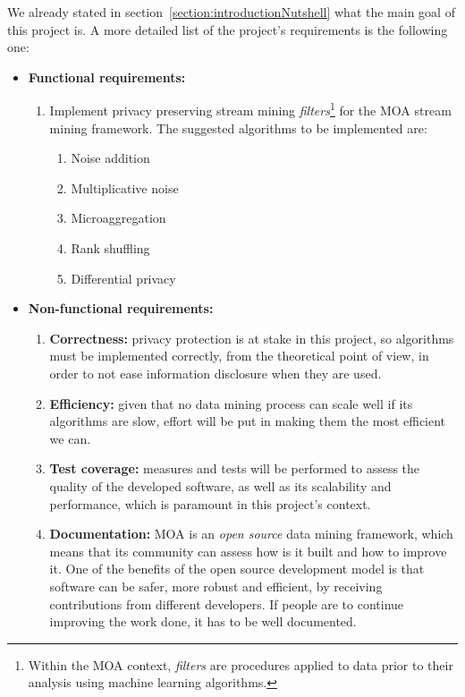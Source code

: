 We already stated in section~\ref{section:introductionNutshell} what the main goal of this project is. A more detailed list of the project's requirements is the following one:

\begin{itemize}
	\item \textbf{Functional requirements:} 
	\begin{enumerate}
		\item Implement privacy preserving stream mining \textit{filters}\footnote{Within the MOA context, \textit{filters} are procedures applied to data prior to their analysis using machine learning algorithms.} for the MOA stream mining framework. The suggested algorithms to be implemented are:
		\begin{enumerate}
			\item Noise addition~\cite[p.~54]{book:StatisticalDisclosureControl}
			\item Multiplicative noise~\cite[p.~57]{book:StatisticalDisclosureControl}
			\item Microaggregation~\cite[p.~60]{book:StatisticalDisclosureControl}
			\item Rank shuffling~\cite[p.~73]{book:StatisticalDisclosureControl}
			\item Differential privacy~\cite{Dwork06differentialprivacy}
		\end{enumerate}
	\end{enumerate}
	
	\item \textbf{Non-functional requirements:}
	\begin{enumerate}
		\item \textbf{Correctness:} privacy protection is at stake in this project, so algorithms must be implemented correctly, from the theoretical point of view, in order to not ease information disclosure when they are used.
		\item \textbf{Efficiency:} given that no data mining process can scale well if its algorithms are slow, effort will be put in making them the most efficient we can.
		\item \textbf{Test coverage:} measures and tests will be performed to assess the quality of the developed software, as well as its scalability and performance, which is paramount in this project’s context.
		\item \textbf{Documentation:} MOA is an \textit{open source} data mining framework, which means that its community can assess how is it built and how to improve it. One of the benefits of the open source development model is that software can be safer, more robust and efficient, by receiving contributions from different developers. If people are to continue improving the work done, it has to be well documented.
	\end{enumerate}
\end{itemize}

